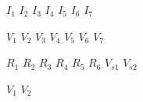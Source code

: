 \documentclass[11pt]{article}
\begin{document}
$I_1$
$I_2$
$I_3$
$I_4$
$I_5$
$I_6$
$I_7$

	

$V_1$
$V_2$
$V_3$
$V_4$
$V_5$
$V_6$
$V_7$

$R_1$	
$R_2$
$R_3$
$R_4$
$R_5$
$R_6$
$V_{s1}$
$V_{s2}$

$V_{1}$
$V_{2}$
\end{document}
